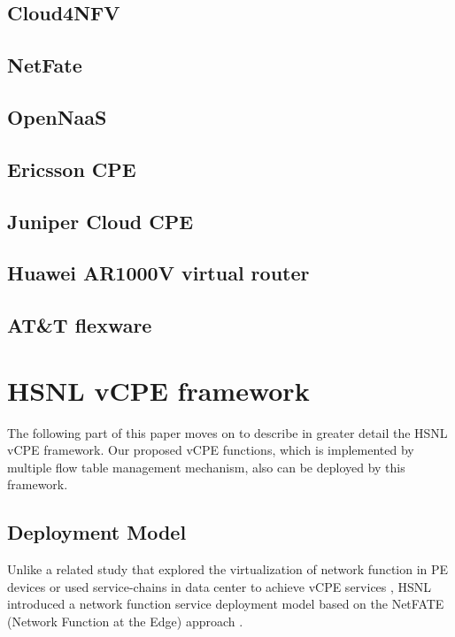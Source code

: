 \subsection{Cloud4NFV}
\subsection{NetFate}
\subsection{OpenNaaS}
\subsection{Ericsson CPE}
\subsection{Juniper Cloud CPE}
\subsection{Huawei AR1000V virtual router}
\subsection{AT\&T flexware}



\section{HSNL vCPE framework} \label{sec:hsnl_vcpe}
The following part of this paper moves on to describe in greater detail the HSNL vCPE framework. Our proposed vCPE functions, which is implemented by multiple flow table management mechanism, also can be deployed by this framework.


\subsection{Deployment Model}
Unlike a related study that explored the virtualization of network function in PE devices \cite{vcpe-enhance} or used service-chains in data center to achieve vCPE services \cite{ericcson-vcpe}, HSNL introduced a network function service deployment model based on the NetFATE (Network Function at the Edge) approach \cite{netfate}.


